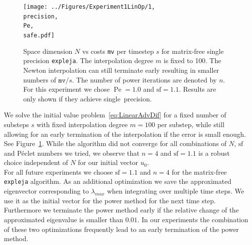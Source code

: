 \documentclass{scrartcl}
\begin{document}
	\begin{figure}[h]
		\newcommand{\Pe}{Pe=1.0}
		\newcommand{\precision}{single}
		\newcommand{\safe}{sf=1.1}
		
		\centering
		\texttt{[image: ../Figures/Experiment1LinOp/1, \\precision, \\Pe, \\safe.pdf]}
		\caption{Space dimension $N$ vs costs \texttt{mv} per timestep $s$ for matrix-free single precision \texttt{expleja}. The interpolation degree $m$ is fixed to 100. The Newton interpolation can still terminate early resulting in smaller numbers of $\texttt{mv}/s$. The number of power iterations are denoted by $n$. For this experiment we chose $\operatorname{Pe}=1.0$ and $\text{sf}=1.1$. Results are only shown if they achieve \precision\ precision.} \label{fig:Poweriterations}
	\end{figure}
	We solve the initial value problem~\ref{eq:LinearAdvDif} for a fixed number of substeps $s$ with fixed interpolation degree $m=100$ per substep, while still allowing for an early termination of the interpolation if the error is small enough. See Figure~\ref{fig:Poweriterations}. While the algorithm did not converge for all combinations of $N$, $\text{sf}$ and P\'eclet numbers we tried, we observe that $n=4$ and $\text{sf}=1.1$ is a robust choice independent of $N$ for our initial vector $u_0$.\\
	For all future experiments we choose $\text{sf}=1.1$ and $n=4$ for the matrix-free \texttt{expleja} algorithm. As an additional optimization we save the approximated eigenvector corresponding to $\lambda_{max}$ when integrating over multiple time steps. We use it as the initial vector for the power method for the next time step. Furthermore we terminate the power method early if the relative change of the approximated eigenvalue is smaller than $0.01$. In our experiments the combination of these two optimizations frequently lead to an early termination of the power method. 
\end{document}
